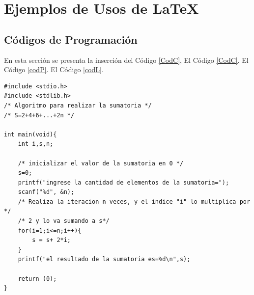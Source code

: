 
\newpage
\chapter{Ejemplos de Usos de \LaTeX}
\section{Códigos de Programación}
En esta sección se presenta la inserción del Código \ref{CodC}, El Código \ref{CodC}. El Código \ref{codP}. El Código \ref{codL}.



\lstset{language=C}
\begin{lstlisting}[caption = C\'odigo en C de una sumatoria, label = CodC]
#include <stdio.h>
#include <stdlib.h>
/* Algoritmo para realizar la sumatoria */
/* S=2+4+6+...+2n */

int main(void){
	int i,s,n;

	/* inicializar el valor de la sumatoria en 0 */
	s=0;
	printf("ingrese la cantidad de elementos de la sumatoria=");
	scanf("%d", &n);
	/* Realiza la iteracion n veces, y el indice "i" lo multiplica por */
	/* 2 y lo va sumando a s*/
	for(i=1;i<=n;i++){
		s = s+ 2*i;
	}
	printf("el resultado de la sumatoria es=%d\n",s);

	return (0);
}
\end{lstlisting}

